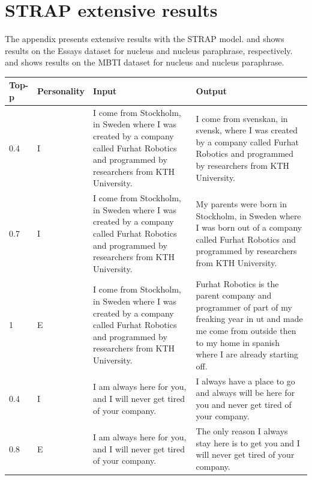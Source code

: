 \documentclass[nomenclature, english, biblatex]{kththesis}
\begin{document}
\chapter{STRAP extensive results}
\label{app:strap_complete_results}
The appendix presents extensive results with the \gls{STRAP} model.  and  shows results on the Essays dataset for nucleus and nucleus paraphrase, respectively.  and  shows results on the MBTI dataset for nucleus and nucleus paraphrase.
\begin{table}
    \centering
    \begin{adjustbox}{max width=\textwidth}
        \begin{tabular}{|p{}|p{}|p{}|p{}|}
        \hline
        Top-p & Personality & Input & Output \\
        \hline
        \hline
        0.4 & I & I come from Stockholm, in Sweden where I was created by a company called Furhat Robotics and programmed by researchers from KTH University. & I come from svenskan, in svensk, where I was created by a company called Furhat Robotics and programmed by researchers from KTH University. \\
        \hline
        0.7 & I & I come from Stockholm, in Sweden where I was created by a company called Furhat Robotics and programmed by researchers from KTH University. & My parents were born in Stockholm, in Sweden where I was born out of a company called Furhat Robotics and programmed by researchers from KTH University. \\
        \hline
        1 & E & I come from Stockholm, in Sweden where I was created by a company called Furhat Robotics and programmed by researchers from KTH University. & Furhat Robotics is the parent company and programmer of part of my freaking year in ut and made me come from outside then to my home in spanish where I are already starting off.\\
        \hline
        0.4 & I & I am always here for you, and I will never get tired of your company. & I always have a place to go and always will be here for you and never get tired of your company. \\
        \hline
        0.8 & E & I am always here for you, and I will never get tired of your company. & The only reason I always stay here is to get you and I will never get tired of your company. \\

\end{tabular}
\end{adjustbox}
\end{table}
\end{document}
